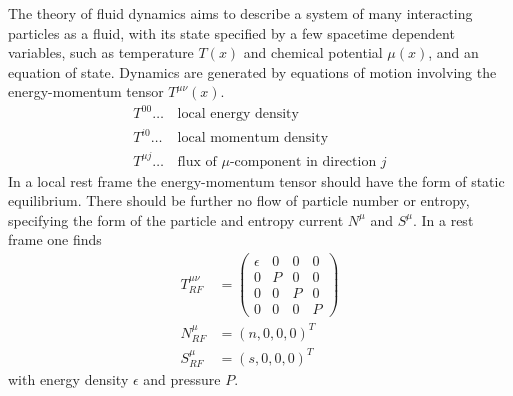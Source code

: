 The theory of fluid dynamics aims to describe a system of many interacting particles as a fluid, with its state specified by a few spacetime dependent variables, such as temperature $T(x)$ and chemical potential $\mu(x)$, and an equation of state. Dynamics are generated by equations of motion involving the energy-momentum tensor $T^{\mu\nu}(x)$.
\begin{equation}
    \begin{split}
        T^{00}\dots\,&\text{local energy density}\\
        T^{i0}\dots\,&\text{local momentum density}\\
        T^{\mu j}\dots\,&\text{flux of }\mu\text{-component in direction }j
    \end{split}
\end{equation}
In a local rest frame the energy-momentum tensor should have the form of static equilibrium. There should be further no flow of particle number or entropy, specifying the form of the particle and entropy current $N^\mu$ and $S^\mu$. In a rest frame one finds
\begin{subequations}
    \begin{align}
        T^{\mu\nu}_{RF} & =
        \begin{pmatrix}
            \epsilon & 0 & 0 & 0 \\
            0        & P & 0 & 0 \\
            0        & 0 & P & 0 \\
            0        & 0 & 0 & P
        \end{pmatrix}
        \label{eq:FluidMechanics_EnMomTens_RestFrame} \\
        N^\mu_{RF}      & =(n,0,0,0)^T                \\
        S^\mu_{RF}      & =(s,0,0,0)^T
    \end{align}
    \label{eq:FluidMechanics_RestFrame_Quantities}
\end{subequations}
with energy density $\epsilon$ and pressure $P$. 

